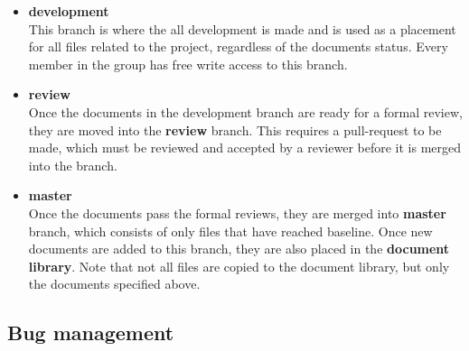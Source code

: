 \documentclass{article}
\begin{document}
            \begin{itemize}
                \item \textbf{development} \\
                This branch is where the all development is made and is used as a placement for all files related
                to the project, regardless of the documents status.
                Every member in the group has free write access to this branch.
                
                \item \textbf{review} \\
                Once the documents in the development branch are ready for a formal review,  they are moved
                into the \textbf{review} branch. This requires a pull-request to be made, which must be
                reviewed and accepted by a reviewer before it is merged into the branch.
                
                \item \textbf{master} \\
                Once the documents pass the formal reviews, they are merged into \textbf{master} branch,
                which consists of only files that have reached baseline.
                Once new documents are added to this branch, they are also placed in the \textbf{document library}.
                Note that not all files are copied to the document library, but only the documents specified above.
                
            \end{itemize}
        
    \subsection{Bug management}
    
\end{document}
